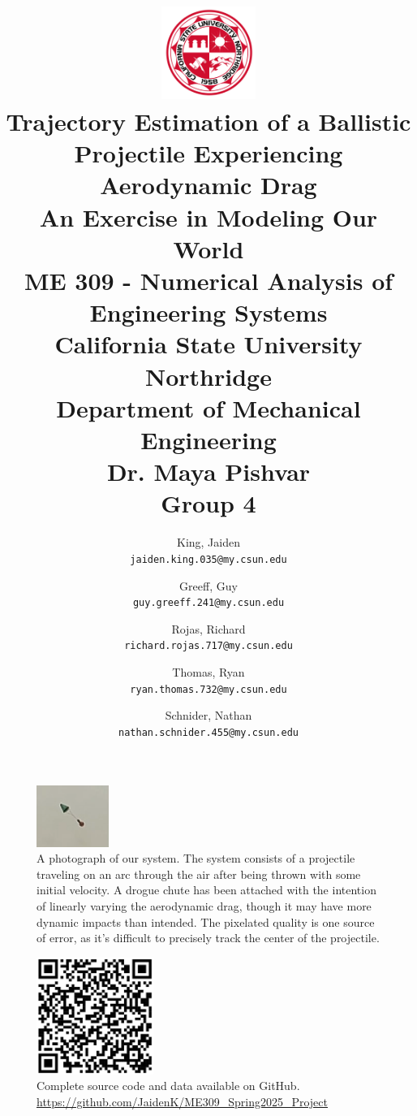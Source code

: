 \documentclass[12pt,english]{article}
\author{
	King, Jaiden\\
	\texttt{jaiden.king.035@my.csun.edu}
	\and
	Greeff, Guy\\
	\texttt{guy.greeff.241@my.csun.edu}
	\and
	Rojas, Richard\\
	\texttt{richard.rojas.717@my.csun.edu}
	\and
	Thomas, Ryan\\
	\texttt{ryan.thomas.732@my.csun.edu}
	\and
	Schnider, Nathan\\
	\texttt{nathan.schnider.455@my.csun.edu}
}
\title{\includegraphics[width=1.2in]{images/CSUNS.png}\\
Trajectory Estimation of a Ballistic Projectile Experiencing Aerodynamic Drag\\
\medskip\large{An Exercise in Modeling Our World\\\medskip ME 309 - Numerical Analysis of Engineering Systems\\California State University Northridge\\Department of Mechanical Engineering\\Dr. Maya Pishvar\\Group 4}\\}
\begin{document}
\maketitle
\newpage



\tableofcontents

\begin{figure}[t]
\centering
\includegraphics[width=0.5\linewidth]{images/BallMidFlight.png}
\caption{\label{fig:BallMidFlight} A photograph of our system. The system consists of a projectile traveling on an arc through the air after being thrown with some initial velocity. A drogue chute has been attached with the intention of linearly varying the aerodynamic drag, though it may have more dynamic impacts than intended. The pixelated quality is one source of error, as it's difficult to precisely track the center of the projectile.}
\end{figure}

\begin{figure}[t]
\centering
\includegraphics[height=1.5in]{images/GitHubQR.png}
\caption{\label{fig:GitHubQR} Complete source code and data available on GitHub. \href{https://github.com/JaidenK/ME309\_Spring2025\_Project}{https://github.com/JaidenK/ME309\_Spring2025\_Project}}
\end{figure}










%



\begin{appendices}





\end{appendices}
\end{document}
